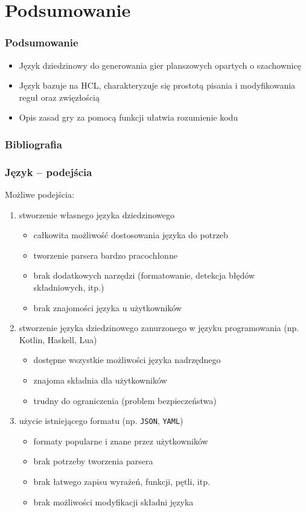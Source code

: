 \documentclass{beamer}
\newcommand\pro{\item[$+$]}
\newcommand\con{\item[$-$]}
\begin{document}
\section{Podsumowanie}

\begin{frame}
	\frametitle{Podsumowanie}

	\begin{itemize}
		\item Język dziedzinowy do generowania gier planszowych opartych o szachownicę
		\item Język bazuje na HCL, charakteryzuje się prostotą pisania i modyfikowania reguł oraz zwięzłością
		\item Opis zasad gry za pomocą funkcji ułatwia rozumienie kodu
	\end{itemize}
\end{frame}

\begin{frame}
	\frametitle{Bibliografia}
	\nocite{*} %
	\printbibliography
\end{frame}

\begin{frame}
	\frametitle{Język -- podejścia}
	Możliwe podejścia:
	\begin{enumerate}
		\item stworzenie własnego języka dziedzinowego
		      \begin{itemize}
			      \pro całkowita możliwość dostosowania języka do potrzeb
			      \con tworzenie parsera bardzo pracochłonne
			      \con brak dodatkowych narzędzi (formatowanie, detekcja błędów składniowych, itp.)
			      \con brak znajomości języka u użytkowników
		      \end{itemize}
		\item stworzenie języka dziedzinowego zanurzonego w języku programowania (np. Kotlin, Haskell, Lua)
		      \begin{itemize}
			      \pro dostępne wszystkie możliwości języka nadrzędnego
			      \pro znajoma składnia dla użytkowników
			      \con trudny do ograniczenia (problem bezpieczeństwa)
		      \end{itemize}
		      \framebreak
		\item użycie istniejącego formatu (np. {\tt JSON}, {\tt YAML})
		      \begin{itemize}
			      \pro formaty popularne i znane przez użytkowników
			      \pro brak potrzeby tworzenia parsera
			      \con brak łatwego zapisu wyrażeń, funkcji, pętli, itp.
			      \con brak możliwości modyfikacji składni języka
		      \end{itemize}
	\end{enumerate}
\end{frame}
\end{document}
